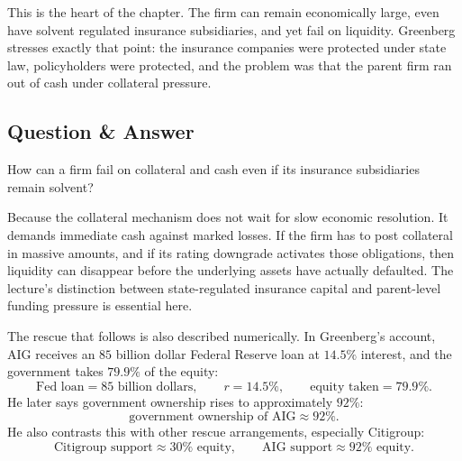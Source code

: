 \begin{figure}[h]
\centering
{}
\end{figure}

This is the heart of the chapter. The firm can remain economically large, even have solvent regulated insurance subsidiaries, and yet fail on liquidity. Greenberg stresses exactly that point: the insurance companies were protected under state law, policyholders were protected, and the problem was that the parent firm ran out of cash under collateral pressure.

\subsection{Question \& Answer}

How can a firm fail on collateral and cash even if its insurance subsidiaries remain solvent?

Because the collateral mechanism does not wait for slow economic resolution. It demands immediate cash against marked losses. If the firm has to post collateral in massive amounts, and if its rating downgrade activates those obligations, then liquidity can disappear before the underlying assets have actually defaulted. The lecture's distinction between state-regulated insurance capital and parent-level funding pressure is essential here.

The rescue that follows is also described numerically. In Greenberg's account, AIG receives an \(85\) billion dollar Federal Reserve loan at \(14.5\%\) interest, and the government takes \(79.9\%\) of the equity:
\begin{equation}
\text{Fed loan} = 85\text{ billion dollars},
\qquad
r = 14.5\%,
\qquad
\text{equity taken} = 79.9\%.
\end{equation}
He later says government ownership rises to approximately \(92\%\):
\begin{equation}
\text{government ownership of AIG} \approx 92\%.
\end{equation}
He also contrasts this with other rescue arrangements, especially Citigroup:
\begin{equation}
\text{Citigroup support} \approx 30\% \text{ equity},
\qquad
\text{AIG support} \approx 92\% \text{ equity}.
\end{equation}

